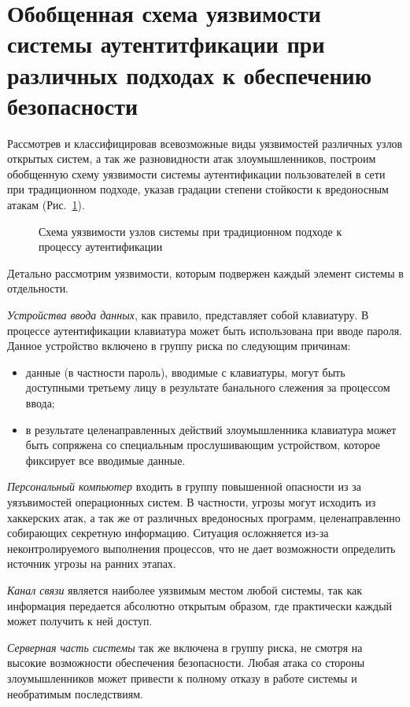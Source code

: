 \section{Обобщенная схема уязвимости системы аутентитфикации при различных
подходах к обеспечению безопасности}

Рассмотрев и классифицировав всевозможные виды уязвимостей различных узлов
открытых систем, а так же разновидности атак злоумышленников, построим
обобщенную схему уязвимости системы аутентификации пользователей в сети при
традиционном подходе, указав градации степени стойкости к вредоносным атакам
(Рис.~\ref{ris:2.1}).

\begin{figure}[h]
\center{\texttt{[image: 2-1]}}
\caption{Схема уязвимости узлов системы при традиционном подходе к
процессу аутентификации}
\label{ris:2.1}
\end{figure}

Детально рассмотрим уязвимости, которым подвержен каждый элемент системы в
отдельности.

\textit{Устройства ввода данных}, как правило, представляет собой клавиатуру. В
процессе аутентификации клавиатура может быть использована при вводе пароля. Данное
устройство включено в группу риска по следующим причинам:
\begin{itemize}
  \item данные (в частности пароль), вводимые с клавиатуры, могут быть
  доступными третьему лицу в результате банального слежения за процессом ввода;
  \item в результате целенаправленных действий злоумышленника клавиатура может
  быть сопряжена со специальным прослушивающим устройством, которое фиксирует
  все вводимые данные.
\end{itemize}

\textit{Персональный компьютер} входить в группу повышенной опасности из за
уязъвимостей операционных систем. В частности, угрозы могут исходить из
хаккерских атак, а так же от различных вредоносных программ, целенаправленно
собирающих секретную информацию. Ситуация осложняется из-за
неконтролируемого выполнения процессов, что не дает возможности определить
источник угрозы на ранних этапах.

\textit{Канал связи} является наиболее уязвимым местом любой системы, так как
информация передается абсолютно открытым образом, где практически каждый может
получить к ней доступ.

\textit{Серверная часть системы} так же включена в группу риска, не смотря на
высокие возможности обеспечения безопасности. Любая атака со стороны
злоумышленников может привести к полному отказу в работе системы и необратимым
последствиям.


